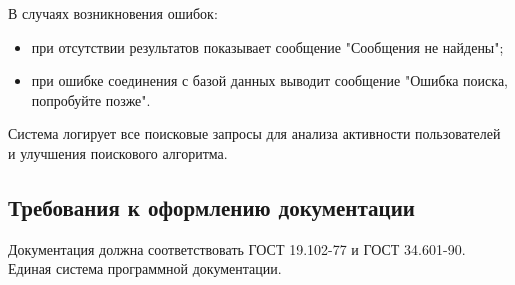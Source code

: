 В случаях возникновения ошибок:
\begin{itemize}
	\item при отсутствии результатов показывает сообщение "Сообщения не найдены";
	\item при ошибке соединения с базой данных выводит сообщение "Ошибка поиска, попробуйте позже".
\end{itemize}

Система логирует все поисковые запросы для анализа активности пользователей и улучшения поискового алгоритма.

\subsection{Требования к оформлению документации}

Документация должна соответствовать ГОСТ 19.102-77 и ГОСТ 34.601-90. Единая система программной документации.